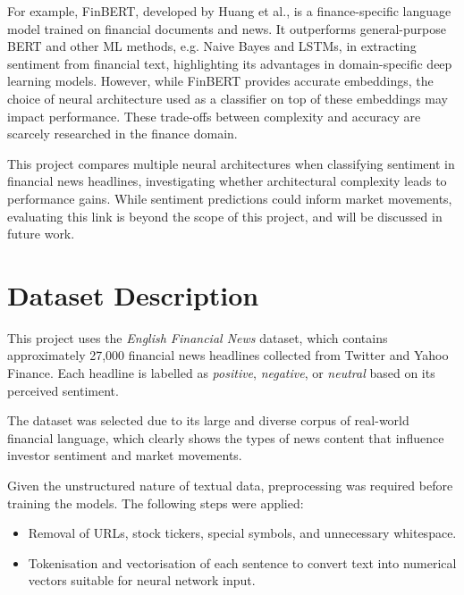 \documentclass[english]{article}
\begin{document}
For example, FinBERT, developed by Huang et al.\cite{Huang2023-zl}, is a finance-specific language model trained on 
financial documents and news. 
It outperforms general-purpose BERT and other ML methods, e.g. Naive Bayes and LSTMs,
in extracting sentiment from financial text, highlighting its advantages in domain-specific deep learning models\cite{Huang2023-zl}.
However, while FinBERT provides accurate embeddings, the choice of neural architecture used as a classifier on top of these embeddings
may impact performance\cite{DevlinJacob2018BPoD}. These trade-offs between complexity and accuracy are scarcely researched in the
finance domain.

This project compares multiple neural architectures when classifying 
sentiment in financial news headlines, investigating whether architectural complexity leads to performance gains.
While sentiment predictions could inform market movements, evaluating this link is beyond the scope of this project, and will be discussed
in future work.

\vspace{-1em}

\section{Dataset Description}

\vspace{-0.5em}

This project uses the \textit{English Financial News} dataset\cite{Calarte2023-mh}, which contains approximately 27,000 
financial news headlines collected from Twitter and Yahoo Finance. Each headline is labelled as \textit{positive}, 
\textit{negative}, or \textit{neutral} based on its perceived sentiment. 

The dataset was selected due to its large and diverse corpus of real-world financial language, which clearly shows 
the types of news content that influence investor sentiment and market movements. 

Given the unstructured nature of textual data, preprocessing was required before training the models. 
The following steps were applied:

\vspace{-0.6em}

\begin{itemize}
    \item Removal of URLs, stock tickers, special symbols, and unnecessary whitespace.
    \item Tokenisation and vectorisation of each sentence to convert text into numerical vectors suitable for neural network input.
\end{itemize}
\end{document}
